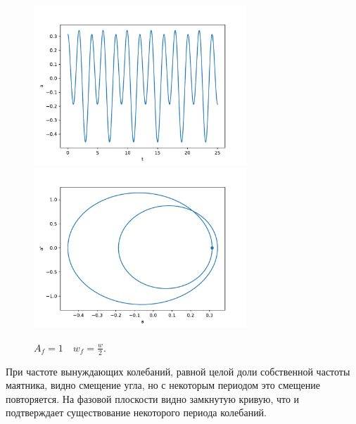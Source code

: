             \begin{figure}[H]
                \centering
                \includegraphics[width=8cm]{pictures/4resonance2.pdf}
                \includegraphics[width=8cm]{pictures/4resonance2p.pdf}
                \caption{$A_f = 1 \quad w_f = \frac{w}{2}$.}
            \end{figure}
            При частоте вынуждающих колебаний, равной целой доли собственной частоты маятника, видно смещение угла, но с некоторым периодом это смещение повторяется. На фазовой плоскости видно замкнутую кривую, что и подтверждает существование некоторого периода колебаний.


